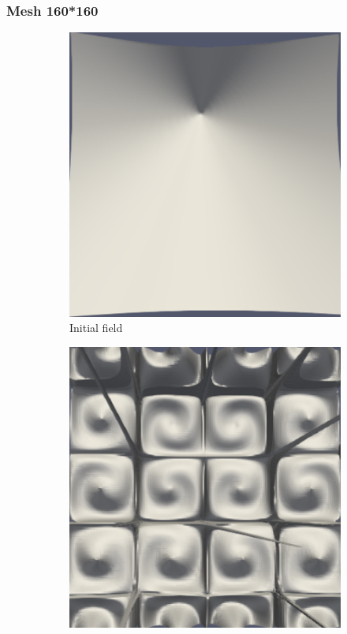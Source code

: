 \documentclass{article}
\begin{document}
\subsubsection{Mesh 160*160}
\begin{figure}[hbt!]
  \begin{subfigure}{0.4\textwidth}
        \centering
        \includegraphics[width=\textwidth]{Figures/e-5 160x160/for n 1.png}
        \caption{Initial field}
  \end{subfigure}
  \hfill
  \begin{subfigure}{0.4\textwidth}
        \centering
        \includegraphics[width=\textwidth]{Figures/e-5 160x160/for n 100.png}

\end{subfigure}
\end{figure}
\end{document}
